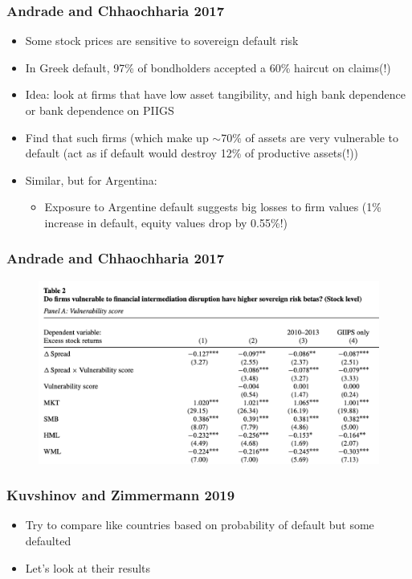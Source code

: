 \documentclass{beamer}
\begin{document}
\begin{frame}
\frametitle{Andrade and Chhaochharia 2017 }
\begin{itemize}
\item Some stock prices are sensitive to sovereign default risk
\bigskip
\item In Greek default, 97\% of bondholders accepted a 60\% haircut on claims(!)
\bigskip
\item Idea:  look at firms that have low asset tangibility, and high bank dependence or bank dependence on PIIGS
\bigskip
\item Find that such firms (which make up $\sim$70\% of assets are very vulnerable to default (act as if default would destroy 12\% of productive assets(!)) 
\bigskip
\item Similar, but for Argentina: 
\begin{itemize}
\item Exposure to Argentine default suggests big losses to firm values (1\% increase in default, equity values drop by 0.55\%!)
\end{itemize}
\end{itemize}
\end{frame}

\begin{frame}
\frametitle{Andrade and Chhaochharia 2017 }
\begin{figure}
\centering
\includegraphics[scale=0.6]{AndradeChhaochharia1.png}
\end{figure}
\end{frame}

\begin{frame}
\frametitle{Kuvshinov and  Zimmermann 2019}
\begin{itemize}
\item Try to compare like countries based on probability of default but some defaulted
\bigskip
\item Let's look at their results
\end{itemize}
\end{frame}
\end{document}
